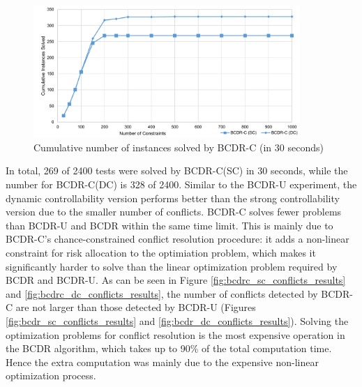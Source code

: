 \documentclass[jair,twoside,11pt,theapa]{article}
\begin{document}
\begin{figure}[!ht]
	\centering
	\includegraphics[width=0.9\textwidth]{figures/results/bcdr_c_runtime.pdf}
	\caption{Cumulative number of instances solved by BCDR-C (in 30 seconds)}
	\label{fig:bcdr_c_runtime_results}
\end{figure}


%
%


In total, 269 of 2400 tests were solved by BCDR-C(SC) in 30 seconds, while the
number for BCDR-C(DC) is 328 of 2400. Similar to the BCDR-U experiment, the
dynamic controllability version performs better than the strong controllability
version due to the smaller number of conflicts. BCDR-C solves fewer problems than BCDR-U and BCDR within the same time limit.
This is mainly due to BCDR-C's chance-constrained conflict resolution procedure:
it adds a non-linear constraint for risk allocation to the optimiation problem,
which makes it significantly harder to solve than the linear optimization
problem required by BCDR and BCDR-U. As can be seen in Figure
\ref{fig:bcdrc_sc_conflicts_results} and \ref{fig:bcdrc_dc_conflicts_results},
the number of conflicts detected by BCDR-C are not larger than those detected
by BCDR-U (Figures \ref{fig:bcdr_sc_conflicts_results} and
\ref{fig:bcdr_dc_conflicts_results}). Solving the optimization problems for
conflict resolution is the most expensive operation in the BCDR algorithm, which
takes up to 90\% of the total computation time. Hence the extra computation was
mainly due to the expensive non-linear optimization process.
\end{document}
